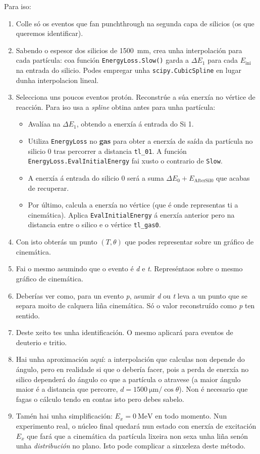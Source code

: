 \documentclass[11pt, a4paper]{article}
\newcommand{\iso}[2]{\ce{^{#1}#2}}
\begin{document}
Para iso:
\begin{enumerate}
    \item Colle só os eventos que fan punchthrough na segunda capa de silicios (os que queremos identificar). 
    \item Sabendo o espesor dos silicios de \qty{1500}{\mm}, crea unha interpolación para cada partícula: coa función \verb|EnergyLoss.Slow()| garda a $\Delta E_1$ para cada $E_{\text{ini}}$ na entrada do silicio. Podes empregar unha \verb|scipy.CubicSpline| en lugar dunha interpolacion lineal.
    \item Selecciona uns poucos eventos protón. Reconstrúe a súa enerxía no vértice de reacción. Para iso usa a \textit{spline} obtina antes para unha partícula:
    \begin{itemize}
        \item Avalíaa na $\Delta E_1$, obtendo a enerxía á entrada do Si 1.
        \item Utiliza \verb|EnergyLoss| no \textbf{gas} para obter a enerxía de saída da partícula no silicio 0 tras percorrer a distancia \verb|tl_01|. A función \verb|EnergyLoss.EvalInitialEnergy| fai xusto o contrario de \verb|Slow|.
        \item A enerxía á entrada do silicio 0 será a suma $\Delta E_0 + E_{\text{AfterSil0}}$ que acabas de recuperar.
        \item  Por último, calcula a enerxía no vértice (que é onde representas ti a cinemática). Aplica \verb|EvalInitialEnergy| á enerxía anterior pero na distancia entre o silico e o vértice \verb|tl_gas0|.
    \end{itemize}
    \item Con isto obterás un punto $(T, \theta)$ que podes representar sobre un gráfico de cinemática. 
    \item Fai o mesmo asumindo que o evento é \textit{d} e \textit{t}. Represéntaos sobre o mesmo gráfico de cinemática.
    \item Deberías ver como, para un evento \textit{p}, asumir \textit{d} ou \textit{t} leva a un punto que se separa moito de calquera liña cinemática. Só o valor reconstruído como \textit{p} ten sentido.
    \item Deste xeito tes unha identificación. O mesmo aplicará para eventos de deuterio e tritio.
    \item Hai unha aproximación aquí: a interpolación que calculas non depende do ángulo, pero en realidade si que o debería facer, pois a perda de enerxía no silico dependerá do ángulo co que a partícula o atravese (a maior ángulo maior é a distancia que percorre, $d = \qty{1500}{\micro\m}/\cos{\theta}$). Non é necesario que fagas o cálculo tendo en contas isto pero debes sabelo.
    \item Tamén hai unha simplificación: $E_{x} = \qty{0}{\MeV}$ en todo momento. Nun experimento real, o núcleo final \iso{10}{Li} quedará nun estado con enerxía de excitación $E_x$ que fará que a cinemática da partícula lixeira non sexa unha liña senón unha \textit{distribución} no plano. Isto pode complicar a sinxeleza deste método.
\end{enumerate}
\end{document}
